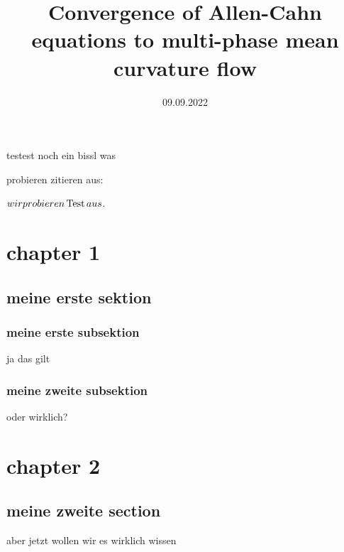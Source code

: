 \documentclass[a4paper, 10pt, bibliogrpahy = totocnumbered]{scrbook}
\date{09.09.2022}
\title{Convergence of Allen-Cahn equations to multi-phase mean curvature flow}
\begin{document}
	
\frontmatter	

	\maketitle
	\tableofcontents
	
\mainmatter	
	testest noch ein bissl was
	
	probieren zitieren aus:
	\cite{convergence_of_allen_cahn_equation_to_multiphase_mean_curvature_flow}
	
	$ wir probieren \operatorname{Test} aus $.
	
	
	
	
	
	\chapter{chapter 1}
	\section{meine erste sektion}
	
	\subsection{meine erste subsektion}
	\begin{theorem}
		ja das gilt
	\end{theorem}

	\subsection{meine zweite subsektion}
	
	\begin{lemma}
		oder wirklich?
	\end{lemma}
	
	\chapter{chapter 2}
	
	\section{meine zweite section}
	
	\begin{definition}
		aber jetzt wollen wir es wirklich wissen
	\end{definition}
\appendix

\backmatter

	\printbibliography
	
\end{document}
